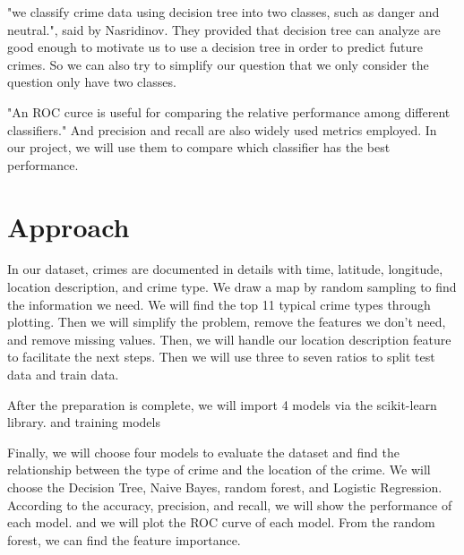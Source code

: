 \documentclass{article}
\begin{document}
"we classify crime data using decision tree into two classes, such as danger and neutral.", said by Nasridinov. \cite{nasridinov2013decision} They provided that decision tree can analyze are good enough to motivate us to use a decision tree in order to predict future crimes. So we can also try to simplify our question that we only consider the question only have two classes.

"An ROC curce is useful for comparing the relative performance among different classifiers."\cite{Tan:2018:IDM:3208440} And precision and recall are also widely used metrics employed. In our project, we will use them to compare which classifier has the best performance.

\section{Approach}
In our dataset, crimes are documented in details with time, latitude, longitude, location description, and crime type. We draw a map by random sampling to find the information we need.
We will find the top 11 typical crime types through plotting. Then we will simplify the problem, remove the features we don't need, and remove missing values. Then, we will handle our location description feature to facilitate the next steps. Then we will use three to seven ratios to split test data and train data.

After the preparation is complete, we will import 4 models via the scikit-learn library. and training models

Finally, we will choose four models to evaluate the dataset and find the relationship between the type of crime and the location of the crime. We will choose the Decision Tree, Naive Bayes, random forest, and  Logistic Regression. According to the accuracy, precision, and recall, we will show the performance of each model. and we will plot the ROC curve of each model. From the random forest, we can find the feature importance. 
\end{document}
